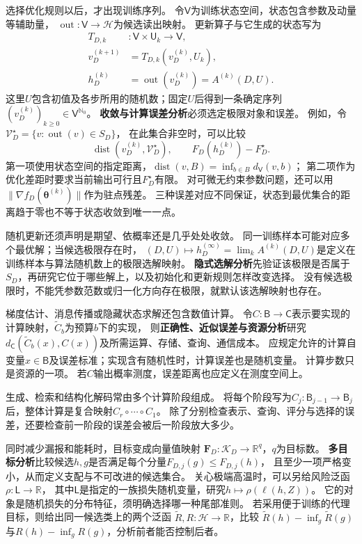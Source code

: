选择优化规则以后，才出现训练序列。
令$\mathsf V$为训练状态空间，状态包含参数及动量等辅助量，
$\operatorname{out}:\mathsf V\to\mathcal H$为候选读出映射。
更新算子与它生成的状态写为
\begin{equation}
  \begin{aligned}
    T_{D,k}&:\mathsf V\times\mathsf U_k\to\mathsf V,\\
    v_D^{(k+1)}&=T_{D,k}(v_D^{(k)},U_k),\\
    h_D^{(k)}&=\operatorname{out}(v_D^{(k)})=A^{(k)}(D,U).
  \end{aligned}
  \label{eq:future-task-update-and-readout}
\end{equation}
这里$U$包含初值及各步所用的随机数；固定$U$后得到一条确定序列
$(v_D^{(k)})_{k\geq0}\in\mathsf V^{\mathbb N_0}$。
\textbf{收敛与计算误差分析}必须选定极限对象和误差。
例如，令$\mathcal V_D^\star=\{v:\operatorname{out}(v)\in S_D\}$，
在此集合非空时，可以比较
\[
  \operatorname{dist}(v_D^{(k)},\mathcal V_D^\star),
  \qquad F_D(h_D^{(k)})-F_D^\star.
\]
第一项使用状态空间的指定距离，$\operatorname{dist}(v,B)=\inf_{b\in B}d_{\mathsf V}(v,b)$；
第二项作为优化差距时要求当前输出可行且$F_D^\star$有限。
对可微无约束参数问题，还可以用$\lVert\nabla f_D(\bm\theta^{(k)})\rVert$作为驻点残差。
三种误差对应不同保证，状态到最优集合的距离趋于零也不等于状态收敛到唯一一点。

随机更新还须声明是期望、依概率还是几乎处处收敛。
同一训练样本可能对应多个最优解；当候选极限存在时，
$(D,U)\mapsto h_D^{(\infty)}=\lim_k A^{(k)}(D,U)$是定义在训练样本与算法随机数上的极限选解映射。
\textbf{隐式选解分析}先验证该极限是否属于$S_D$，再研究它位于哪些解上，以及初始化和更新规则怎样改变选择。
没有候选极限时，不能凭参数范数或归一化方向存在极限，就默认该选解映射也存在。

梯度估计、消息传播或隐藏状态求解还包含数值计算。
令$C:\mathsf B\to\mathsf C$表示要实现的计算映射，$\widetilde C_b$为预算$b$下的实现，
则\textbf{正确性、近似误差与资源分析}研究
$d_{\mathsf C}(\widetilde C_b(x),C(x))$及所需运算、存储、查询、通信成本。
应规定允许的计算自变量$x\in\mathsf B$及误差标准；实现含有随机性时，计算误差也是随机变量。
计算步数只是资源的一项。
若$C$输出概率测度，误差距离也应定义在测度空间上。

生成、检索和结构化解码常由多个计算阶段组成。
将每个阶段写为$C_j:\mathsf B_{j-1}\to\mathsf B_j$后，整体计算是复合映射$C_r\circ\cdots\circ C_1$。
除了分别检查表示、查询、评分与选择的误差，还要检查前一阶段的误差会被后一阶段放大多少。

同时减少漏报和能耗时，目标变成向量值映射
$\bm F_D:\mathcal K_D\to\mathbb R^q$，$q$为目标数。
\textbf{多目标分析}比较候选$h,g$是否满足每个分量$F_{D,j}(g)\leq F_{D,j}(h)$，
且至少一项严格变小，从而定义支配与不可改进的候选集合。
关心极端高温时，可以另给风险泛函$\rho:\mathsf L\to\mathbb R$，
其中$\mathsf L$是指定的一族损失随机变量，研究$h\mapsto\rho(\ell(h,Z))$。
它的对象是随机损失的分布特征，须明确选择哪一种尾部准则。
若采用便于训练的代理目标，则给出同一候选类上的两个泛函
$\widetilde R,R:\mathcal H\to\mathbb R$，比较
$\widetilde R(h)-\inf_g\widetilde R(g)$与$R(h)-\inf_gR(g)$，分析前者能否控制后者。

